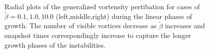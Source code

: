 \begin{figure}
  \centering
\hfill
\hfill
  \caption{Radial plots of the generalized vortensity pertibation for cases of $\tilde{\beta}=0.1,1.0,10.0$ (left,middle,right) during the linear phases of growth. The number of visible vortices decrease as $\tilde{\beta}$ increases and snapshot times correspondingly increase to capture the longer growth phases of the instabilities. \label{2Dlinear}}
\end{figure}

